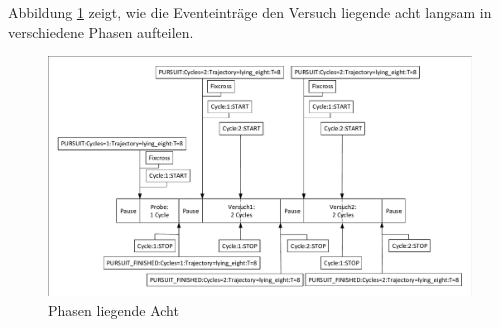 Abbildung \ref{fig:liegendeAcht} zeigt, wie die Eventeintr\"age den Versuch liegende acht langsam in verschiedene Phasen aufteilen.

\begin{figure}[H]
	\noindent \begin{centering}
		\includegraphics[width=15cm]{pics/Phasen-liegende-Acht.pdf}
		\par\end{centering}
	\caption{\label{fig:liegendeAcht}Phasen liegende Acht}
\end{figure}